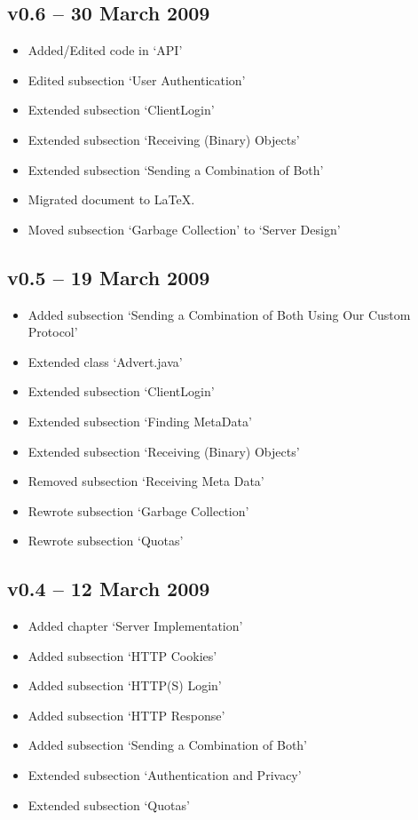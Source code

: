 \subsection*{v0.6 -- 30 March 2009}
\begin{itemize}
  \item Added/Edited code in `API' 
  \item Edited subsection `User Authentication'
  \item Extended subsection `ClientLogin'
  \item Extended subsection `Receiving (Binary) Objects'
  \item Extended subsection `Sending a Combination of Both'
  \item Migrated document to \LaTeX.
  \item Moved subsection `Garbage Collection' to `Server Design'
\end{itemize}

\subsection*{v0.5 -- 19 March 2009}
\begin{itemize}
  \item Added subsection `Sending a Combination of Both Using Our Custom Protocol'
  \item Extended class `Advert.java'
  \item Extended subsection `ClientLogin'
  \item Extended subsection `Finding MetaData'
  \item Extended subsection `Receiving (Binary) Objects'
  \item Removed subsection `Receiving Meta Data'
  \item Rewrote subsection `Garbage Collection'
  \item Rewrote subsection `Quotas'
\end{itemize}

\subsection*{v0.4 -- 12 March 2009}
\begin{itemize}
  \item Added chapter `Server Implementation'
  \item Added subsection `HTTP Cookies'
  \item Added subsection `HTTP(S) Login'
  \item Added subsection `HTTP Response'
  \item Added subsection `Sending a Combination of Both'
  \item Extended subsection `Authentication and Privacy'
  \item Extended subsection `Quotas'
\end{itemize}

